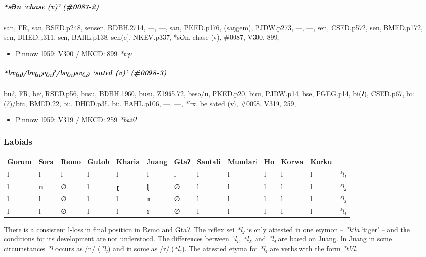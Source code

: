 \documentclass[a4paper,]{article}
\providecommand{\tightlist}{%
  \setlength{\itemsep}{0pt}\setlength{\parskip}{0pt}}
\let\oldsubparagraph\subparagraph
\renewcommand{\subparagraph}[1]{\oldsubparagraph{#1}\mbox{}}
\begin{document}
\subparagraph{\texorpdfstring{\emph{*sƏn} `chase (v)'
(\#0087-2)}{*sƏn chase (v) (\#0087-2)}}\label{sux259n-chase-v-0087-2-1}

san, FR, san, RSED.p248, sensen, BDBH.2714, ---, ---, san, PKED.p176,
(saŋgem), PJDW.p273, ---, ---, sen, CSED.p572, sen, BMED.p172, sen,
DHED.p311, sen, BAHL.p138, sen(e), NKEV.p337, *sƏn, chase (v), \#0087,
V300, 899,

\begin{itemize}
\tightlist
\item
  Pinnow 1959: V300 / MKCD: 899 \emph{*təɲ}
\end{itemize}

\subparagraph{\texorpdfstring{\emph{*bv₍₃₁₎/bv₍₃₁₎v₍₃₁₎ˀ/bv₍₃₁₎sv₍₃₂₎}
`sated (v)'
(\#0098-3)}{*bv₍₃₁₎/bv₍₃₁₎v₍₃₁₎ˀ/bv₍₃₁₎sv₍₃₂₎ sated (v) (\#0098-3)}}\label{bvbvvux2c0bvsv-sated-v-0098-3}

buʔ, FR, beˀ, RSED.p56, busu, BDBH.1960, busu, Z1965.72, beso/u,
PKED.p20, bisu, PJDW.p14, bse, PGEG.p14, bi(ʔ), CSED.p67, bi:(ʔ)/biu,
BMED.22, bi:, DHED.p35, bi:, BAHL.p106, ---, ---, *bx, be sated (v),
\#0098, V319, 259,

\begin{itemize}
\tightlist
\item
  Pinnow 1959: V319 / MKCD: 259 \emph{*bhiiʔ}
\end{itemize}

\subsubsection{Labials}\label{labials}

\begin{longtable}[]{@{}lllllllllllll@{}}
\toprule
Gorum & Sora & Remo & Gutob & Kharia & Juang & Gtaʔ & Santali & Mundari
& Ho & Korwa & Korku &\tabularnewline
\midrule
\endhead
l & l & l & l & l & l & l & l & l & l & l & l &
\emph{*l₁}\tabularnewline
l & \textbf{n} & ∅ & l & \textbf{ɽ} & \textbf{ɭ} & ∅ & l & l & l & l & l
& \emph{*l₂}\tabularnewline
l & l & ∅ & l & l & \textbf{n} & ∅ & l & l & l & l & l &
\emph{*l₃}\tabularnewline
l & l & ∅ & l & l & \textbf{r} & ∅ & l & l & l & l & l &
\emph{*l₄}\tabularnewline
\bottomrule
\end{longtable}

There is a consistent l-loss in final position in Remo and Gtaʔ. The
reflex set \emph{*l₂} is only attested in one etymon -- \emph{*kᵊla}
`tiger' -- and the conditions for its development are not understood.
The differences between \emph{*l₁}, \emph{*l₃}, and \emph{*l₄} are based
on Juang. In Juang in some circumstances \emph{*l} occurs as /n/
(\emph{*l₃}) and in some as /r/ (\emph{*l₄}). The attested etyma for
\emph{*l₄} are verbs with the form \emph{*tVl}.
\end{document}

